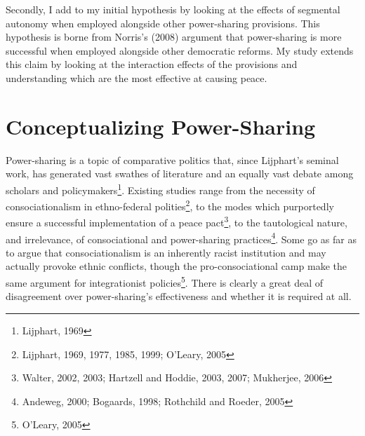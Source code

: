 \documentclass[12pt]{article}
\begin{document}
Secondly, I add to my initial hypothesis by looking at the effects of segmental autonomy when employed alongside other power-sharing provisions. This hypothesis is borne from Norris’s (2008) argument that power-sharing is more successful when employed alongside other democratic reforms. My study extends this claim by looking at the interaction effects of the provisions and understanding which are the most effective at causing peace.

\section{Conceptualizing Power-Sharing} 
Power-sharing is a topic of comparative politics that, since Lijphart’s seminal work, has generated vast swathes of literature and an equally vast debate among scholars and policymakers\footnote{Lijphart, 1969}. Existing studies range from the necessity of consociationalism in ethno-federal polities\footnote{Lijphart, 1969, 1977, 1985, 1999; O’Leary, 2005}, to the modes which purportedly ensure a successful implementation of a peace pact\footnote{Walter, 2002, 2003; Hartzell and Hoddie, 2003, 2007; Mukherjee, 2006}, to the tautological nature, and irrelevance, of consociational and power-sharing practices\footnote{Andeweg, 2000; Bogaards, 1998; Rothchild and Roeder, 2005}. Some go as far as to argue that consociationalism is an inherently racist institution and may actually provoke ethnic conflicts, though the pro-consociational camp make the same argument for integrationist policies\footnote{O’Leary, 2005}. There is clearly a great deal of disagreement over power-sharing’s effectiveness and whether it is required at all. 
\end{document}
